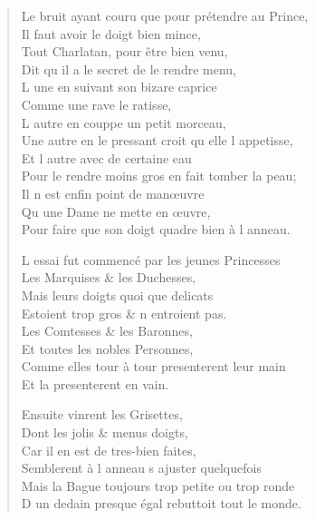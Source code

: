 \documentclass[14pt,a4paper]{memoir}
\begin{document}
{{\begin{otherlanguage}{french}
\begin{verse}
Le bruit ayant couru que pour prétendre au Prince, \\
\vin Il faut avoir le doigt bien mince, \\
\vin Tout Charlatan, pour être bien venu, \\
Dit qu\textquotesingle{} il a le secret de le rendre menu, \\
\vin L\textquotesingle{} une en suivant son bizare caprice \\
\vin Comme une rave le ratisse, \\
\vin L\textquotesingle{} autre en couppe un petit morceau, \\
Une autre en le pressant croit qu\textquotesingle{} elle l\textquotesingle{} appetisse, \\
\vin Et l\textquotesingle{} autre avec de certaine eau \\
Pour le rendre moins gros en fait tomber la peau; \\
\vin Il n\textquotesingle{} est enfin point de manœuvre \\
\vin Qu\textquotesingle{} une Dame ne mette en œuvre, \\
Pour faire que son doigt quadre bien à l\textquotesingle{} anneau.

L\textquotesingle{} essai fut commencé par les jeunes Princesses \\
\vin Les Marquises \& les Duchesses, \\
\vin Mais leurs doigts quoi que delicats \\
\vin Estoient trop gros \& n\textquotesingle{} entroient pas. \\
\vin Les Comtesses \& les Baronnes, \\
\vin Et toutes les nobles Personnes, \\
Comme elles tour à tour presenterent leur main \\
\vin Et la presenterent en vain.

\vin Ensuite vinrent les Grisettes, \\
\vin Dont les jolis \& menus doigts, \\
\vin Car il en est de tres-bien faites, \\
Semblerent à l\textquotesingle{} anneau s\textquotesingle{} ajuster quelquefois \\
Mais la Bague toujours trop petite ou trop ronde \\
D\textquotesingle{} un dedain presque égal rebuttoit tout le monde.


\end{verse}
\end{otherlanguage}}}
\end{document}

